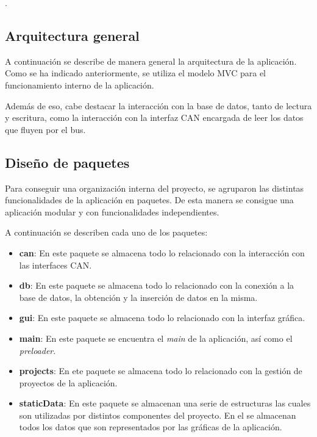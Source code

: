 .

\subsection{Arquitectura general}

A continuación se describe de manera general la arquitectura de la aplicación. Como se ha indicado anteriormente, se utiliza el modelo MVC para el funcionamiento interno de la aplicación.

Además de eso, cabe destacar la interacción con la base de datos, tanto de lectura y escritura, como la interacción con la interfaz CAN encargada de leer los datos que fluyen por el bus.


\subsection{Diseño de paquetes}

Para conseguir una organización interna del proyecto, se agruparon las distintas funcionalidades de la aplicación en paquetes. De esta manera se consigue una aplicación modular y con funcionalidades independientes.


A continuación se describen cada uno de los paquetes:

\begin{itemize}
\item
\textbf{can}: En este paquete se almacena todo lo relacionado con la interacción con las interfaces CAN.
\item
\textbf{db}: En este paquete se almacena todo lo relacionado con la conexión a la base de datos, la obtención y la inserción de datos en la misma.
\item
\textbf{gui}: En este paquete se almacena todo lo relacionado con la interfaz gráfica. 
\item
\textbf{main}: En este paquete se encuentra el \emph{main} de la aplicación, así como el \emph{preloader}.
\item
\textbf{projects}: En ete paquete se almacena todo lo relacionado con la gestión de proyectos de la aplicación.
\item
\textbf{staticData}: En este paquete se almacenan una serie de estructuras las cuales son utilizadas por distintos componentes del proyecto. En el se almacenan todos los datos que son representados por las gráficas de la aplicación.
\end{itemize}

